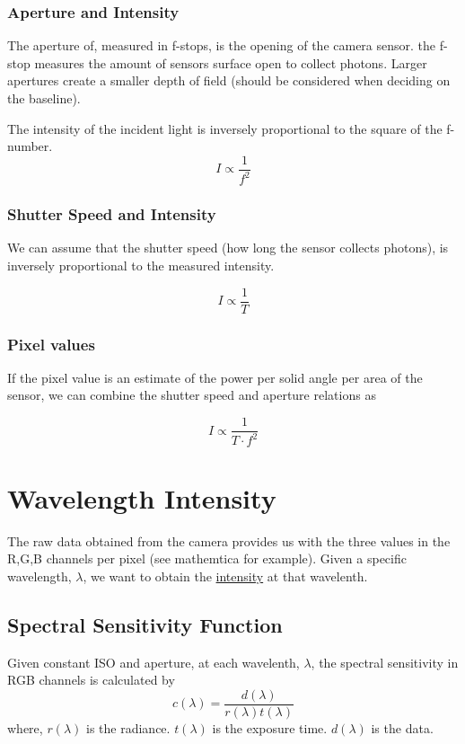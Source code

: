 \documentclass{article}
\begin{document}
\subsubsection{Aperture and Intensity}

The aperture of, measured in f-stops, is the opening of the camera sensor. the
f-stop measures the amount of sensors surface open to collect photons. Larger
apertures create a smaller depth of field (should be considered when deciding on the baseline).

The intensity of the incident light is inversely proportional to the square of the
f-number.
$$ I \propto \frac{1}{f^2} $$

\subsubsection{Shutter Speed and Intensity}
We can assume that the shutter speed (how long the sensor collects photons), is inversely proportional
to the measured intensity.

$$ I \propto \frac{1}{T}$$

\subsubsection{Pixel values}

If the pixel value is an estimate of the power per solid angle per area of the sensor, we can combine the
shutter speed and aperture relations as

$$ I \propto \frac{1}{T \cdot f^2}$$
\section{Wavelength Intensity}

The raw data obtained from the camera provides us with the three values in the
R,G,B channels per pixel (see mathemtica for example). Given a specific wavelength, $ \lambda$, we want to obtain the
\underline{intensity} at that wavelenth.

\subsection{Spectral Sensitivity Function}

Given constant ISO and aperture, at each wavelenth, $ \lambda$, the spectral sensitivity
in RGB channels is calculated by
$$ c(\lambda) = \frac{d(\lambda)}{r(\lambda) t(\lambda)} $$
where, $ r(\lambda)$ is the radiance. $t(\lambda) $ is the exposure time.
$d(\lambda)$ is the data.
\end{document}
